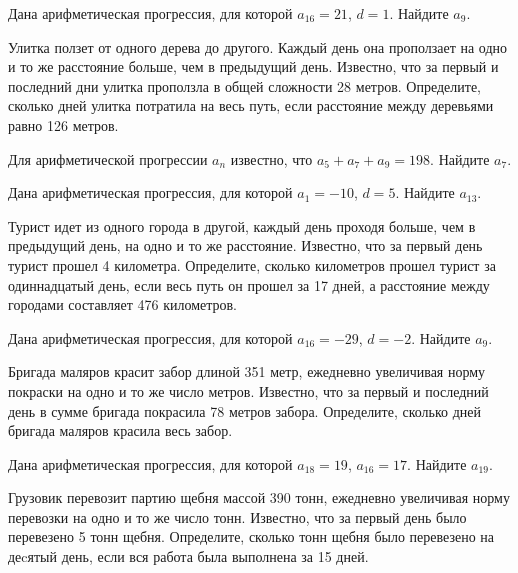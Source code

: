\documentclass[4apaper]{article}
\begin{document}
\begin{taskBN}{53}
Дана арифметическая прогрессия, для которой $a_{16} = 21$, $d=1$. Найдите $a_{9}$.
\end{taskBN}

\begin{taskBN}{54}
 Улитка ползет от одного дерева до другого. Каждый день она проползает на одно и то же расстояние больше, чем в предыдущий день. Известно, что за первый и последний дни улитка проползла в общей сложности 28 метров. Определите, сколько дней улитка потратила на весь путь, если расстояние между деревьями равно 126 метров.
\end{taskBN}

\begin{taskBN}{55}
Для арифметической прогрессии ${a_n}$ известно, что $a_{5} + a_{7} + a_{9}= 198$. Найдите $a_{7}$.
\end{taskBN}

\begin{taskBN}{56}
Дана арифметическая прогрессия, для которой $a_1 = -10$, $d=5$. Найдите $a_{13}$.
\end{taskBN}

\begin{taskBN}{57}
Турист идет из одного города в другой, каждый день проходя больше, чем в предыдущий день, на одно и то же расстояние. Известно, что за первый день турист прошел 4 километра. Определите, сколько километров прошел турист за одиннадцатый день, если весь путь он прошел за 17 дней, а расстояние между городами составляет 476 километров.
\end{taskBN}

\begin{taskBN}{58}
Дана арифметическая прогрессия, для которой $a_{16} = -29$, $d=-2$. Найдите $a_{9}$.
\end{taskBN}

\begin{taskBN}{59}
 Бригада маляров красит забор длиной 351 метр, ежедневно увеличивая норму покраски на одно и то же число метров. Известно, что за первый и последний день в сумме бригада покрасила 78 метров забора.  Определите, сколько дней бригада маляров красила весь забор. 
\end{taskBN}

\begin{taskBN}{60}
Дана арифметическая прогрессия, для которой $a_{18} = 19$, $a_{16} = 17$. Найдите $a_{19}$.
\end{taskBN}

\begin{taskBN}{61}
Грузовик перевозит партию щебня массой 390 тонн, ежедневно увеличивая норму перевозки на одно и то же число тонн. Известно, что за первый день было перевезено 5 тонн щебня. Определите, сколько тонн щебня было перевезено на деcятый день, если вся работа была выполнена за 15 дней.
\end{taskBN}
\end{document}
